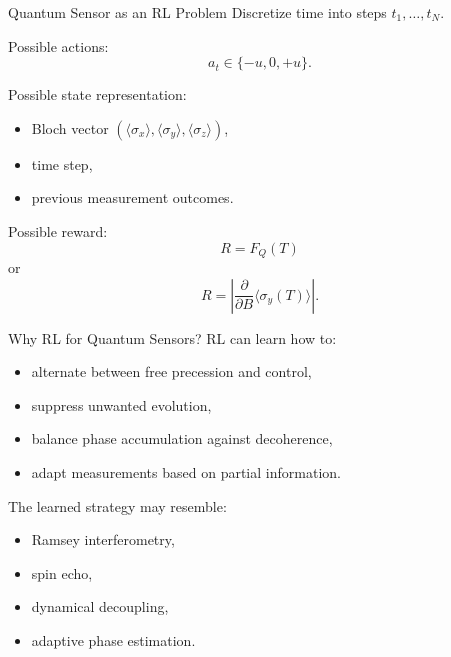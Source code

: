 \documentclass[aspectratio=169]{beamer}
\begin{document}
\begin{frame}{Quantum Sensor as an RL Problem}
  Discretize time into steps $t_1,\dots,t_N$.

  Possible actions:
  \[
  a_t \in \{-u,0,+u\}.
  \]

  Possible state representation:
  \begin{itemize}
  \item Bloch vector $(\langle \sigma_x\rangle,\langle \sigma_y\rangle,\langle \sigma_z\rangle)$,
  \item time step,
  \item previous measurement outcomes.
  \end{itemize}

  Possible reward:
  \[
  R = F_Q(T)
  \]
  or
  \[
  R=\left|\frac{\partial}{\partial B}\langle \sigma_y(T)\rangle\right|.
  \]
\end{frame}

\begin{frame}{Why RL for Quantum Sensors?}
  RL can learn how to:
  \begin{itemize}
  \item alternate between free precession and control,
  \item suppress unwanted evolution,
  \item balance phase accumulation against decoherence,
  \item adapt measurements based on partial information.
  \end{itemize}

  The learned strategy may resemble:
  \begin{itemize}
  \item Ramsey interferometry,
  \item spin echo,
  \item dynamical decoupling,
  \item adaptive phase estimation.
  \end{itemize}
\end{frame}
\end{document}
